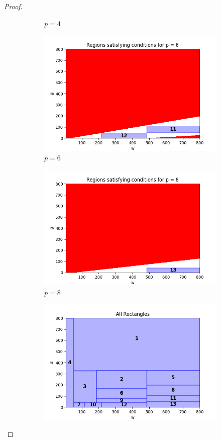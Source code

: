 \documentclass{article}
\begin{document}
\begin{proof}
\begin{figure}[ht]
\begin{subfigure}{0.32\textwidth}
        \caption{$p = 4$}
    \end{subfigure}
    \hfill
    \begin{subfigure}{0.32\textwidth}
        \includegraphics[width=\linewidth]{plotsgen/plot_p_6.png}
        \caption{$p = 6$}
    \end{subfigure}
    \hfill
    \begin{subfigure}{0.32\textwidth}
        \includegraphics[width=\linewidth]{plotsgen/plot_p_8.png}
        \caption{$p = 8$}
    \end{subfigure}
    \begin{subfigure}{0.32\textwidth}
        \includegraphics[width=\linewidth]{plotsgen/rectanglesall.png}

\end{subfigure}
\end{figure}
\end{proof}
\end{document}
